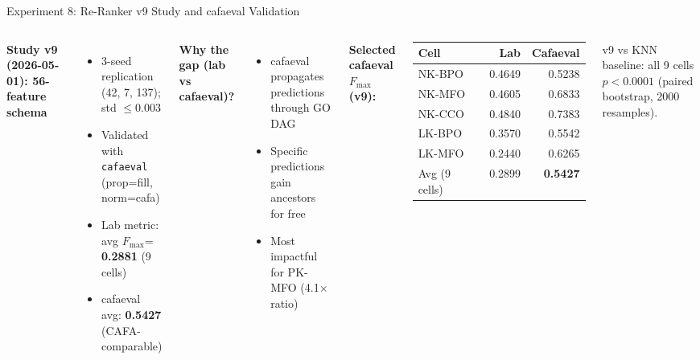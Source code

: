 \documentclass[12pt, aspectratio=169]{beamer}
\newcommand{\fmax}{$F_{\max}$}
\newcommand{\highlight}[1]{\textcolor{proteagreen}{\textbf{#1}}}
\begin{document}
\begin{frame}{Experiment 8: Re-Ranker v9 Study and cafaeval Validation}
  \begin{columns}[t]
      \textbf{Study v9 (2026-05-01): 56-feature schema}
      \begin{itemize}
        \item 3-seed replication (42, 7, 137); std $\leq 0.003$
        \item Validated with \texttt{cafaeval} (prop=fill, norm=cafa)
        \item Lab metric: avg \fmax = \highlight{0.2881} (9 cells)
        \item cafaeval avg: \highlight{0.5427} (CAFA-comparable)
      \end{itemize}
      \vspace{0.4em}
      \textbf{Why the gap (lab vs cafaeval)?}
      \begin{itemize}
        \item cafaeval propagates predictions through GO DAG
        \item Specific predictions gain ancestors for free
        \item Most impactful for PK-MFO (4.1$\times$ ratio)
      \end{itemize}
      \textbf{Selected cafaeval \fmax (v9):}
      \vspace{0.3em}
      \begin{tabular}{lrr}
        \toprule
        Cell & Lab & Cafaeval \\
        \midrule
        NK-BPO & 0.4649 & 0.5238 \\
        NK-MFO & 0.4605 & 0.6833 \\
        NK-CCO & 0.4840 & 0.7383 \\
        LK-BPO & 0.3570 & 0.5542 \\
        LK-MFO & 0.2440 & 0.6265 \\
        \midrule
        Avg (9 cells) & 0.2899 & \textbf{0.5427} \\
        \bottomrule
      \end{tabular}
      \vspace{0.3em}
      {\small v9 vs KNN baseline: all 9 cells $p < 0.0001$ (paired bootstrap, 2000 resamples).}
  \end{columns}
\end{frame}
\end{document}
